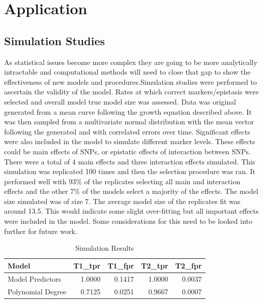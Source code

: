 \documentclass[11pt,]{book}
\theoremstyle{definition}
\theoremstyle{definition}
\theoremstyle{remark}
\begin{document}
\section{Application}\label{application-2}

\subsection{Simulation Studies}\label{simulation-studies-1}

As statistical issues become more complex they are going to be more
analytically intractable and computational methods will need to close
that gap to show the effectiveness of new models and
procedures.Simulation studies were performed to ascertain the validity
of the model. Rates at which correct markers/epistasis were selected and
overall model true model size was assessed. Data was original generated
from a mean curve following the growth equation described above. It was
then sampled from a multivariate normal distribution with the mean
vector following the generated and with correlated errors over time.
Significant effects were also included in the model to simulate
different marker levels. These effects could be main effects of SNPs, or
epistatic effects of interaction between SNPs. There were a total of 4
main effects and three interaction effects simulated. This simulation
was replicated 100 times and then the selection procedure was ran. It
performed well with 93\% of the replicates selecting all main and
interaction effects and the other 7\% of the models select a majority of
the effects. The model size simulated was of size 7. The average model
size of the replicates fit was around 13.5. This would indicate some
slight over-fitting but all important effects were included in the
model. Some considerations for this need to be looked into further for
future work.

\begin{table}

\caption{\label{tab:Chap4SimResults}Simulation Results}
\centering
\begin{tabular}[t]{l|r|r|r|r}
\hline
Model & T1\_tpr & T1\_fpr & T2\_tpr & T2\_fpr\\
\hline
Model Predictors & 1.0000 & 0.1417 & 1.0000 & 0.0037\\
\hline
Polynomial Degree & 0.7125 & 0.0251 & 0.9667 & 0.0007\\
\hline
\end{tabular}
\end{table}
\end{document}

